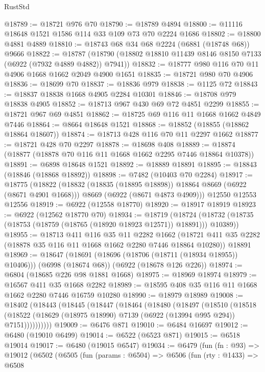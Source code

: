 \begin{lexlean}{RustStd}
\begin{coremodule}
@18789 := @18721 @976 @70
@18790 := @18789 @4894
@18800 := @11116 @18648 @1521 @1586 @114 @33 @109 @73 @70 @2224 @1686
@18802 := @18800 @4881 @4889
@18810 := @18743 @68 @34 @68 @2224 (@6881 (@18748 @68)) @9666
@18822 := @18787 (@18790 (@18802 @18810 @11439 @8146 @8150 @7133 (@6922 (@7932 @4889 @4882)) @7941))
@18832 := @18777 @980 @116 @70 @11 @4906 @1668 @1662 @2049 @4900 @1651
@18835 := @18721 @980 @70 @4906
@18836 := @18699 @70
@18837 := @18836 @979
@18838 := @1125 @72
@18843 := @18837 @18838 @1668 @4905 @2284 @10301
@18846 := @18708 @979 @18838 @4905
@18852 := @18713 @967 @430 @69 @72 @4851 @2299
@18855 := @18721 @967 @69 @4851
@18862 := @18725 @69 @116 @11 @1668 @1662 @4849 @7446
@18864 := @8664 @18648 @1521
@18868 := @18852 (@18855 (@18862 @18864 @18607))
@18874 := @18713 @428 @116 @70 @11 @2297 @1662
@18877 := @18721 @428 @70 @2297
@18878 := @18698 @408
@18889 := @18874 (@18877 (@18878 @70 @116 @11 @1668 @1662 @2295 @7446 @18864 @10378))
@18891 := @6898 @18648 @1521
@18892 := @18889 @18891
@18895 := @18843 (@18846 (@18868 @18892))
@18898 := @7482 (@10403 @70 @2284)
@18917 := @18775
    (@18822
      (@18832 (@18835 (@18895 @18898)) @18864 @8669 (@6922 (@8671 @4901 @1668)))
      @8669
      (@6922 (@8671 @4873 @4909)))
    @12550
    @12553
    @12556
@18919 := @6922 (@12558 @18770)
@18920 := @18917 @18919
@18923 := @6922 (@12562 @18770 @70)
@18934 := @18719
    (@18724 (@18732 (@18735 (@18753 (@18759 (@18765 (@18920 @18923 @12571)) @18891))) @10389))
@18955 := @18713
    @411
    @116
    @35
    @11
    @2282
    @1662
    (@18721 @411 @35 @2282 (@18878 @35 @116 @11 @1668 @1662 @2280 @7446 @18864 @10280))
    @18891
@18969 := @18647
    (@18691 (@18696 (@18706 (@18711 (@18934 @18955)) @10406)))
    (@6998 (@18674 @68))
    (@6922 (@18678 @126 @226))
@18974 := @6804 (@18685 @226 @98 @1881 @1668)
@18975 := @18969 @18974
@18979 := @16567 @411 @35 @1668 @2282
@18989 := @18595 @408 @35 @116 @11 @1668 @1662 @2280 @7446 @16759 @10280
@18990 := @18979 @18989
@19008 := @18402
    (@18443
      (@18445
        (@18447
          (@18464
            (@18480
              (@18497
                (@18510
                  (@18518
                    (@18522 (@18629 (@18975 @18990) @7139 (@6922 (@13994 @995 @294)) @7151))))))))))
@19009 := @6476 @871
@19010 := @6484 @16697
@19012 := @6480 (@19010 @6499)
@19014 := @6522 (@6523 @871)
@19015 := @6518 @19014
@19017 := @6480 (@19015 @6547)
@19034 := @6479
    (fun (fn : @93) =>
    @19012
      (@6502
        (@6505
          (fun (params : @6504) =>
          @6506
            (fun (rty : @1433) =>
            @6508

\end{coremodule}
\end{lexlean}
